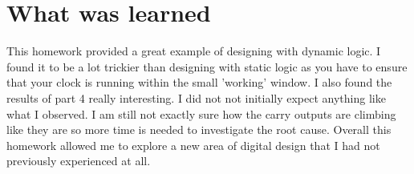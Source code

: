 \documentclass{article}
\begin{document}
\section*{What was learned}
This homework provided a great example of designing with dynamic logic. I found
it to be a lot trickier than designing with static logic as you have to ensure
that your clock is running within the small 'working' window. I also found the
results of part 4 really interesting. I did not not initially expect anything
like what I observed. I am still not exactly sure how the carry outputs are
climbing like they are so more time is needed to investigate the root cause.
Overall this homework allowed me to explore a new area of digital design that I
had not previously experienced at all.
\end{document}
